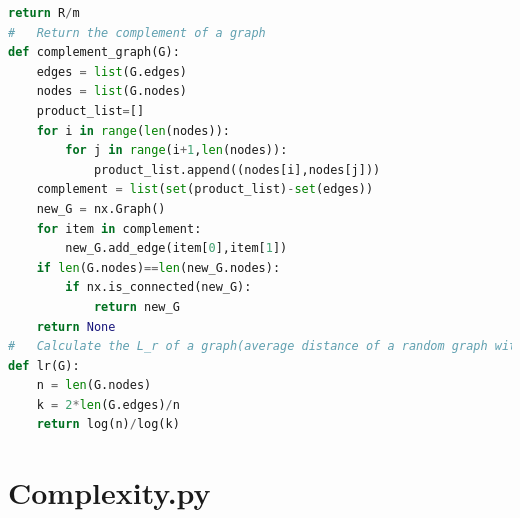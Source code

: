 \documentclass[12pt]{article}
\begin{document}
\begin{lstlisting}[language=Python,breaklines=true]
    return R/m
#   Return the complement of a graph
def complement_graph(G):
    edges = list(G.edges)
    nodes = list(G.nodes)
    product_list=[]
    for i in range(len(nodes)):
        for j in range(i+1,len(nodes)):
            product_list.append((nodes[i],nodes[j]))
    complement = list(set(product_list)-set(edges))
    new_G = nx.Graph()
    for item in complement:
        new_G.add_edge(item[0],item[1])
    if len(G.nodes)==len(new_G.nodes):
        if nx.is_connected(new_G):
            return new_G
    return None
#   Calculate the L_r of a graph(average distance of a random graph with given m and n)
def lr(G):
    n = len(G.nodes)
    k = 2*len(G.edges)/n
    return log(n)/log(k)
\end{lstlisting}
\section{Complexity.py}
\label{complexity_code}
\end{document}
